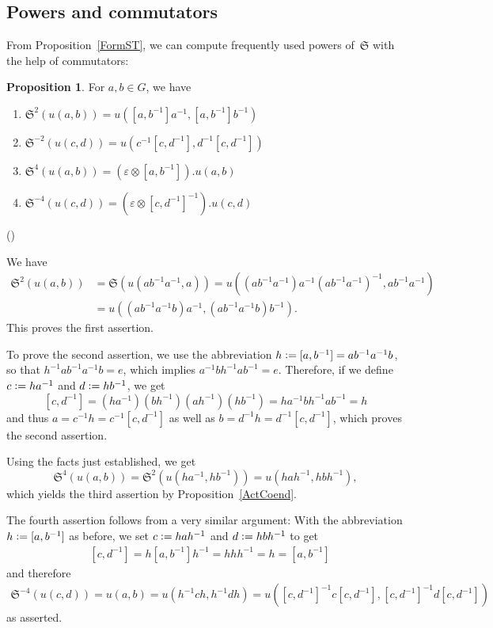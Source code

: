 \documentclass[12pt]{article}
\makeatletter
\newcounter{num}
\newenvironment{pflist}{\begin{list}{(\arabic{num})}{\usecounter{num} \leftmargin0cm \itemindent5pt}}{\end{list}}
\theoremstyle{definition}
\newtheorem{Proposition}[Satz]{Proposition}
\theoremstyle{break}
\renewenvironment{proof}[1][\proofname]{\par
\vspace{-5pt}%
\pushQED{\qed}%
\normalfont
\topsep0pt \partopsep0pt %
\trivlist
\item[\hskip\labelsep
\bfseries
#1\@addpunct{.}]\ignorespaces
}{%
\popQED\endtrivlist\@endpefalse
\addvspace{6pt plus 6pt} %
}
\newcommand{\fS}{\mathfrak{S}}
\renewcommand{\1}{\mathbbm{1}}
\newcommand{\ot}{\mathbin{\otimes}}
\newcommand{\uu}{u}
\newcommand{\deq}{\vcentcolon =}
\makeatother
\begin{document}
\subsection{Powers and commutators} \label{PowComm}
From Proposition~\ref{FormST}, we can compute frequently used powers of~$\fS$ with the help of commutators:
\begin{Proposition} \label{PowS}
For $a, b \in G$, we have
\begin{enumerate}
\item
$\fS^2(\uu(a,b)) = \uu([a, b^{-1}] a^{-1}, [a, b^{-1}] b^{-1})$

\item
$\fS^{-2}(\uu(c,d)) = \uu(c^{-1} [c, d^{-1}], d^{-1} [c, d^{-1}])$

\item
$\fS^4(\uu(a,b)) = (\varepsilon \ot [a, b^{-1}]). \uu(a,b)$

\item
$\fS^{-4}(\uu(c,d)) = (\varepsilon \ot [c, d^{-1}]^{-1}).\uu(c,d)$
\end{enumerate}
\end{Proposition}
\begin{proof}
\begin{pflist}
\item
We have
\begin{align*}
\fS^2(\uu(a,b)) &= \fS(\uu(a b^{-1} a^{-1}, a))
= \uu((a b^{-1} a^{-1}) a^{-1} (a b^{-1} a^{-1})^{-1}, a b^{-1} a^{-1}) \\
&= \uu((a b^{-1} a^{-1} b) a^{-1}, (a b^{-1} a^{-1} b) b^{-1}).
\end{align*}
This proves the first assertion.

\item
To prove the second assertion, we use the abbreviation
$h \deq [a, b^{-1}] = a b^{-1} a^{-1} b$, so that $h^{-1} a b^{-1} a^{-1} b = e$, which implies $a^{-1} b h^{-1} a b^{-1} = e$. Therefore, if we define
$c \deq h a^{-1}$ and $d \deq h b^{-1}$, we get
\[ [c, d^{-1}] = (ha^{-1}) (b h^{-1}) (a h^{-1}) (hb^{-1})
= h a^{-1} b h^{-1} a b^{-1} = h\]
and thus $a = c^{-1} h = c^{-1} [c, d^{-1}]$ as well as $b = d^{-1} h = d^{-1} [c, d^{-1}]$, which proves the second assertion.

\item
Using the facts just established, we get
\[\fS^4(\uu(a,b)) = \fS^2(\uu(h a^{-1}, h b^{-1})) = \uu(h a h^{-1}, h b h^{-1}),\]
which yields the third assertion by Proposition~\ref{ActCoend}.

\item
The fourth assertion follows from a very similar argument: With the abbreviation
$h \deq [a, b^{-1}]$ as before, we set $c \deq h a h^{-1}$ and $d \deq h b h^{-1}$ to get
\begin{align*}
&[c, d^{-1}] = h [a, b^{-1}] h^{-1} = h h h^{-1} = h = [a, b^{-1}]
\end{align*}
and therefore
\begin{align*}
\fS^{-4}(\uu(c,d)) = \uu(a,b) = \uu(h^{-1} c h,h^{-1} d h)
= \uu([c, d^{-1}]^{-1} c [c, d^{-1}],[c, d^{-1}]^{-1} d [c, d^{-1}])
\end{align*}
as asserted.
\qedhere
\end{pflist}
\end{proof}
\end{document}
